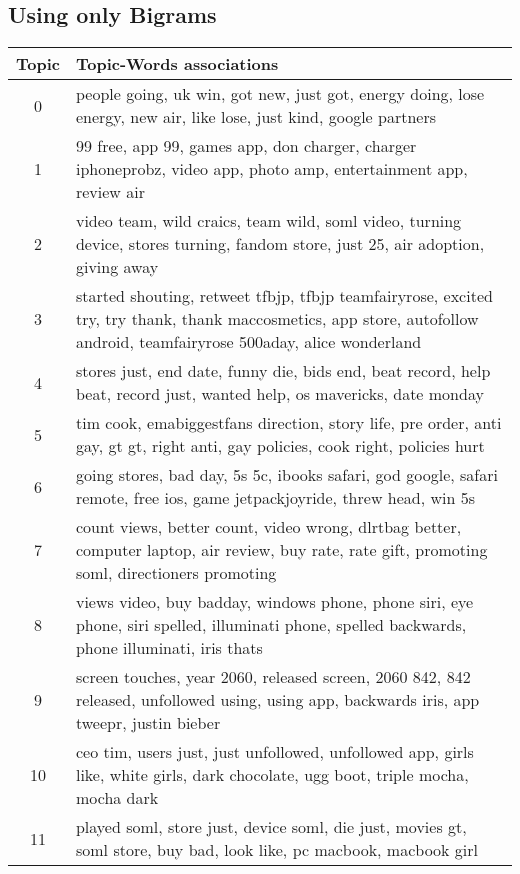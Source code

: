 \subsection{Using only Bigrams}
\label{sec:using_bigrams}
\begin{table}
  \begin{tabular}{c p{16cm}} \toprule
    Topic & Topic-Words associations \\ \midrule
    0     & people going, uk win, got new, just got, energy doing, lose energy, new air, like lose, just kind, google partners \\ \midrule
    1     & 99 free, app 99, games app, don charger, charger iphoneprobz, video app, photo amp, entertainment app, review air \\ \midrule
    2     & video team, wild craics, team wild, soml video, turning device, stores turning, fandom store, just 25, air adoption, giving away \\ \midrule
    3     & started shouting, retweet tfbjp, tfbjp teamfairyrose, excited try, try thank, thank maccosmetics, app store, autofollow android, teamfairyrose 500aday, alice wonderland \\ \midrule
    4     & stores just, end date, funny die, bids end, beat record, help beat, record just, wanted help, os mavericks, date monday \\ \midrule
    5     & tim cook, emabiggestfans direction, story life, pre order, anti gay, gt gt, right anti, gay policies, cook right, policies hurt \\ \midrule
    6     & going stores, bad day, 5s 5c, ibooks safari, god google, safari remote, free ios, game jetpackjoyride, threw head, win 5s \\ \midrule
    7     & count views, better count, video wrong, dlrtbag better, computer laptop, air review, buy rate, rate gift, promoting soml, directioners promoting \\ \midrule
    8     & views video, buy badday, windows phone, phone siri, eye phone, siri spelled, illuminati phone, spelled backwards, phone illuminati, iris thats \\ \midrule
    9     & screen touches, year 2060, released screen, 2060 842, 842 released, unfollowed using, using app, backwards iris, app tweepr, justin bieber \\ \midrule
    10    & ceo tim, users just, just unfollowed, unfollowed app, girls like, white girls, dark chocolate, ugg boot, triple mocha, mocha dark \\ \midrule
    11    & played soml, store just, device soml, die just, movies gt, soml store, buy bad, look like, pc macbook, macbook girl \\ \midrule

\end{tabular}
\end{table}
